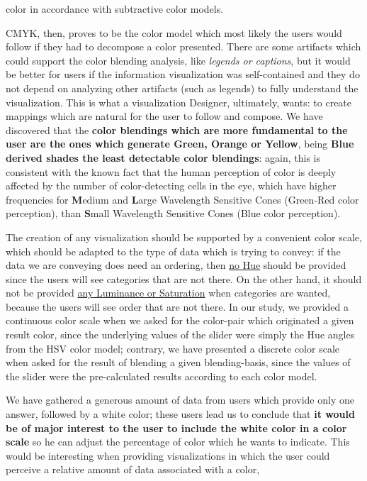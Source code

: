 color in accordance with subtractive color models. \par
%
CMYK, then, proves to be the color model which most likely the users would follow if they had to decompose a color presented. There are some artifacts
which could support the color blending analysis, like \emph{legends or captions}, but it would be better for users if the information visualization was self-contained
and they do not depend on analyzing other artifacts (such as legends) to fully understand the visualization. This is what a visualization Designer, ultimately, wants: to create mappings which are natural
for the user to follow and compose. We have discovered that the \textbf{color blendings which are more fundamental to the user are the ones which
generate Green, Orange or Yellow}, being \textbf{Blue derived shades the least detectable color blendings}: again, this is consistent with the known
fact that the human perception of color is deeply affected by the number of color-detecting cells in the eye, which have higher frequencies for
\textbf{M}edium and \textbf{L}arge Wavelength Sensitive Cones (Green-Red color perception), than \textbf{S}mall Wavelength Sensitive Cones
(Blue color perception). \par
%
The creation of any visualization should be supported by a convenient color scale, which should be adapted to the type of data which is trying to
convey: if the data we are conveying does need an ordering, then \ul{no Hue} should be provided since the users will see categories that are not there.
On the other hand, it should not be provided \ul{any Luminance or Saturation} when categories are wanted, because the users will see order that are not
there. In our study, we provided a continuous color scale when we asked for the color-pair which originated a given result color, since the underlying
values of the slider were simply the Hue angles from the HSV color model; contrary, we have presented a discrete color scale when asked for the result
of blending a given blending-basis, since the values of the slider were the pre-calculated results according to each color model. \par
%
We have gathered a generous amount of data from users which provide only one answer, followed by a white color; these users lead us to conclude that
\textbf{it would be of major interest to the user to include the white color in a color scale} so he can adjust the percentage of color which he wants
to indicate. This would be interesting when providing visualizations in which the user could perceive a relative amount of data associated with a color,
